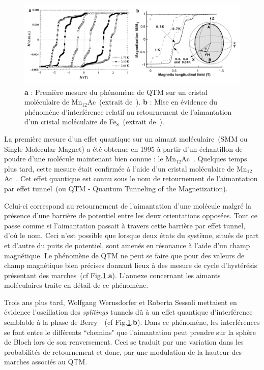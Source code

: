 \begin{figure}
\centering \includegraphics[scale=0.45]{Spintronique/MolecularMag/MolecularMag.pdf}
\caption{\textbf{a} : Première mesure du phénomène de QTM sur un cristal moléculaire de Mn$_{12}$Ac~(extrait de~\cite{Thomas1996}). \textbf{b} : Mise en évidence du phénomène d'interférence relatif au retournement de l'aimantation d'un cristal moléculaire de Fe$_{8}$~(extrait de~\cite{Wernsdorfer1999}).}
\label{MolecularMag}
\end{figure}

La première mesure d'un effet quantique sur un aimant moléculaire~(SMM ou Single Molecular Magnet) a été obtenue en 1995 à partir d'un échantillon de poudre d'une molécule maintenant bien connue : le Mn$_{12}$Ac~\cite{Friedman1996}. Quelques temps plus tard, cette mesure était confirmée à l'aide d'un cristal moléculaire de Mn$_{12}$Ac~\cite{Thomas1996}. Cet effet quantique est connu sous le nom de retournement de l'aimantation par effet tunnel~(ou QTM - Quantum Tunneling of the Magnetization).

Celui-ci correspond au retournement de l'aimantation d'une molécule malgré la présence d'une barrière de potentiel entre les deux orientations opposées. Tout ce passe comme si l'aimantation passait à travers cette barrière par effet tunnel, d'où le nom. Ceci n'est possible que lorsque deux états du système, situés de part et d'autre du puits de potentiel, sont amenés en résonance à l'aide d'un champ magnétique. Le phénomène de QTM ne peut se faire que pour des valeurs de champ magnétique bien précises donnant lieux à des mesure de cycle d'hystérésis présentant des marches~(cf Fig.\ref{MolecularMag}.\textbf{a}). L'annexe concernant les aimants moléculaires traite en détail de ce phénomène.

Trois ans plus tard, Wolfgang Wernsdorfer et Roberta Sessoli mettaient en évidence l'oscillation des \textit{splitings} tunnels dû à un effet quantique d'interférence semblable à la phase de Berry~\cite{Wernsdorfer1999}~(cf Fig.\ref{MolecularMag}.\textbf{b}). Dans ce phénomène, les interférences se font entre le différents ``chemins" que l’aimantation peut prendre sur la sphère de Bloch lors de son renversement. Ceci se traduit par une variation dans les probabilités de retournement et donc, par une modulation de la hauteur des marches associés au QTM.

